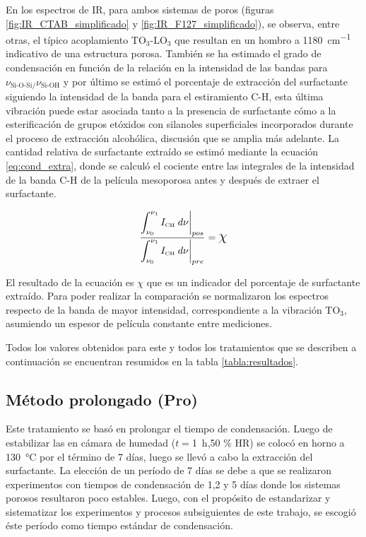 {			 En los espectros de IR, para ambos sistemas de poros (figuras \ref{fig:IR_CTAB_simplificado} y \ref{fig:IR_F127_simplificado}), se observa, entre otras, el típico acoplamiento TO$_3$-LO$_3$ que resultan en un hombro a \SI{1180}{\cm^{-1}}} indicativo de una estructura porosa\cite{Innocenzi2003}. También se ha estimado el grado de condensación en función de la relación en la intensidad de las bandas para $\nu_{\text{Si-O-Si/}}\nu_{\text{Si-OH}}$ y por último se estimó el porcentaje de extracción del surfactante siguiendo la intensidad de la banda para el estiramiento C-H, esta última vibración puede estar asociada tanto a la presencia de surfactante cómo a la esterificación de grupos etóxidos con silanoles superficiales incorporados durante el proceso de extracción alcohólica, discusión que se amplia más adelante. La cantidad relativa de surfactante extraído se estimó mediante la ecuación \ref{eq:cond_extra}, donde se calculó el cociente entre las integrales de la intensidad de la banda C-H de la película mesoporosa antes y después de extraer el surfactante. 

			  \begin{equation}		
				\dfrac{\displaystyle\int_{\nu_0}^{\nu_1} I_{\mbox{\tiny{CH}}}\; d\nu \bigg|_{pos}}{\displaystyle\int_{\nu_0}^{\nu_1} I_{\mbox{\tiny{CH}}}\; d\nu\bigg|_{pre}} = \mbox{\Large$\chi$}
				\label{eq:cond_extra}
			  \end{equation}


			 El resultado de la ecuación es \mbox{\Large$\chi$} que es un indicador del porcentaje de surfactante extraído. Para poder realizar la comparación se normalizaron los espectros respecto de la banda de mayor intensidad, correspondiente a la vibración TO$_3$, asumiendo un espesor de película constante entre mediciones.

			 \pagebreak Todos los valores obtenidos para este y todos los tratamientos que se describen a continuación se encuentran resumidos en la tabla \ref{tabla:resultados}.

	 \subsection{Método prolongado (Pro)}

	 	 Este tratamiento se basó en prolongar el tiempo de condensación. Luego de estabilizar las \pdm\space en cámara de humedad ($t=$\SI{1}{\hour},50 \% HR) se colocó en horno a \SI{130}{\celsius} por el término de 7 días, luego se llevó a cabo la extracción del surfactante. La elección de un período de 7 días se debe a que se realizaron experimentos con tiempos de condensación de 1,2 y 5 días donde los sistemas porosos resultaron poco estables. Luego, con el propósito de estandarizar y sistematizar los experimentos y procesos subsiguientes de este trabajo, se escogió éste período como tiempo estándar de condensación.

